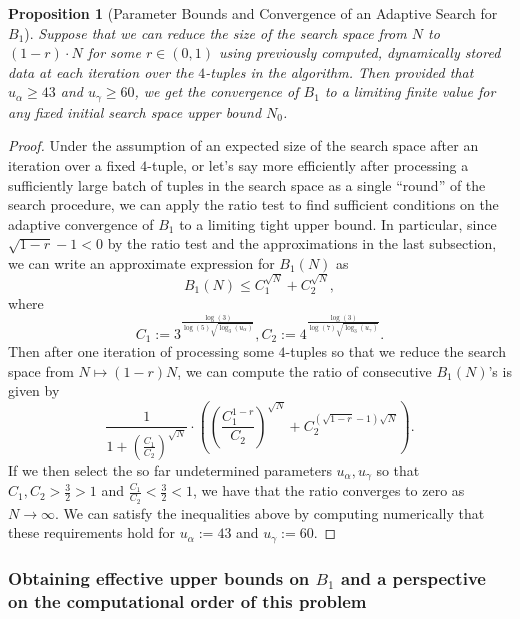 \documentclass[12pt]{article}
\newtheorem{prop}[theorem]{Proposition}
\begin{document}
\begin{prop}[Parameter Bounds and Convergence of an Adaptive Search for $B_1$]
Suppose that we can reduce the size of the search space from $N$ to $(1-r) \cdot N$ for some $r \in (0, 1)$ 
using previously computed, dynamically stored data at each iteration over the $4$-tuples in the 
algorithm. Then provided that $u_{\alpha} \geq 43$ and $u_{\gamma} \geq 60$, we get the 
convergence of $B_1$ to a limiting finite value 
for any fixed initial search space upper bound $N_0$. 
\end{prop} 
\begin{proof} 
Under the assumption of an expected size of the search space after an iteration over a fixed $4$-tuple, or 
let's say more efficiently after processing a sufficiently large batch of tuples in the search space as a 
single ``round'' of the search procedure, we can apply the ratio test to find sufficient conditions 
on the adaptive convergence of $B_1$ to a limiting tight upper bound. 
In particular, since $\sqrt{1-r}-1 < 0$ by the ratio test and the approximations in the last subsection, 
we can write an approximate expression for $B_1(N)$ as 
\[
B_1(N) \leq C_1^{\sqrt{N}} + C_2^{\sqrt{N}}, 
\]
where $$C_1 := 3^{\frac{\log(3)}{\log(5) \sqrt{\log_3(u_{\alpha})}}},
C_2 := 4^{\frac{\log(3)}{\log(7) \sqrt{\log_3(u_{\gamma})}}}.$$
Then after one iteration of processing some $4$-tuples so that we reduce the search space from 
$N \mapsto (1-r)N$, we can compute the ratio of consecutive $B_1(N)$'s is given by 
\[
\frac{1}{1+\left(\frac{C_1}{C_2}\right)^{\sqrt{N}}} \cdot \left( 
     \left(\frac{C_1^{1-r}}{C_2}\right)^{\sqrt{N}} + C_2^{(\sqrt{1-r}-1)\sqrt{N}}\right). 
\] 
If we then select the so far undetermined parameters $u_{\alpha},u_{\gamma}$ so that 
$C_1,C_2>\frac{3}{2}>1$ and $\frac{C_1}{C_2} < \frac{3}{2} < 1$, we have that the ratio converges to 
zero as $N \rightarrow \infty$. 
We can satisfy the inequalities above by computing numerically that these requirements hold 
for $u_{\alpha} := 43$ and $u_{\gamma} := 60$. 
\end{proof} 

\subsubsection{Obtaining effective upper bounds on $B_1$ and a perspective on the computational 
     order of this problem} 
     
\end{document}

